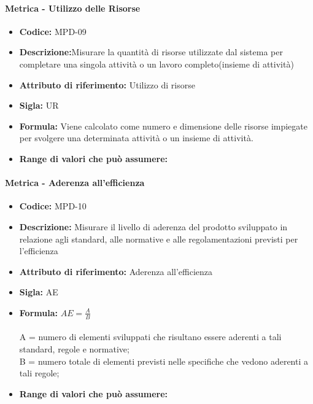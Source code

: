                \paragraph{Metrica - Utilizzo delle Risorse} 
                  \begin{itemize}
         \item   \textbf{Codice:} MPD-09
         \item   \textbf{Descrizione:}Misurare la quantità di risorse utilizzate dal sistema per completare una singola attività o un lavoro completo(insieme di attività)
          \item  \textbf{Attributo di riferimento:} Utilizzo di risorse
          \item  \textbf{Sigla:} UR
           \item \textbf{Formula:} Viene calcolato come numero e dimensione delle risorse impiegate per svolgere una determinata attività o un insieme di attività.
        \item   \textbf{Range di valori che può assumere:}
      \end{itemize}
      
               \paragraph{Metrica - Aderenza all'efficienza} 
                  \begin{itemize}
          \item  \textbf{Codice:} MPD-10
          \item  \textbf{Descrizione:} Misurare il livello di aderenza del prodotto sviluppato in relazione agli standard, alle normative e alle regolamentazioni previsti per l'efficienza
          \item  \textbf{Attributo di riferimento:} Aderenza all'efficienza 
          \item  \textbf{Sigla:} AE
          \item  \textbf{Formula:} \begin{math}AE = \frac{A}{B}\end{math}\\ \\
            A = numero di elementi sviluppati che risultano essere aderenti a tali standard, regole e normative;\\
            B = numero totale di elementi previsti nelle specifiche che vedono aderenti a tali regole;
         
         \item  \textbf{Range di valori che può assumere:}
      \end{itemize}
      
